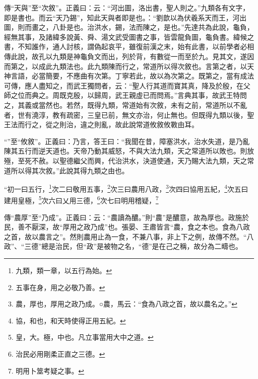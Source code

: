 {\noindent\zhuan{}\fzbyks 傳“天與”至“次敘”。正義曰：云：“河出圖，洛出書，聖人則之。”九類各有文字，即是書也。而云“天乃錫”，知此天與者即是也。：“劉歆以為伏羲系天而王，河出圖，則而畫之，八卦是也。治洪水，錫，法而陳之，是也。”先達共為此說，龜負，經無其事，及諸緯多說黃、舜、湯文武受圖書之事，皆雲龍負圖，龜負書。緯候之書，不知誰作，通人討核，謂偽起哀平，雖復前漢之末，始有此書，以前學者必相傳此說，故孔以九類是神龜負文而出，列於背，有數從一而至於九。見其文，遂因而第之，以成此九類法也。此九類陳而行之，常道所以得次敘也。言第之者，以天神言語，必當簡要，不應曲有次第。丁寧若此，故以為次第之。既第之，當有成法可傳，應人盡知之，而武王獨問者，云：“聖人行其道而寶其真，降及於殷，在父師之位而典之。周既克殷，以歸周，武王親虛已而問焉。”言典其事，故武王特問之，其義或當然也。若然，既得九類，常道始有次敘，未有之前，常道所以不亂者，世有澆淳，教有疏密，三皇已前，無文亦治，何止無也。但既得九類以後，聖王法而行之，從之則治，違之則亂，故此說常道攸敘攸斁由耳。 \par}

{\noindent\shu{}\fzkt “”至“攸敘”。正義曰：乃言，答王曰：“我聞在昔，障塞洪水，治水失道，是乃亂陳其五行而逆天道也。天帝乃動其威怒，不與大法九類，天之常道所以敗也。則放殛，至死不赦。以聖德繼父而興，代治洪水，決道使通，天乃賜大法九類，天之常道所以得其次敘。”此說其得九類之由也。 \par}

“初一曰五行，\footnote{九類，類一章，以五行為始。}次二曰敬用五事，\footnote{五事在身，用之必敬乃善。}次三曰農用八政，\footnote{農，厚也，厚用之政乃成。○農，馬云：“食為八政之首，故以農名之。”}次四曰協用五紀，\footnote{協，和也，和天時使得正用五紀。}次五曰建用皇極，\footnote{皇，大。極，中也。凡立事當用大中之道。}次六曰乂用三德，\footnote{治民必用剛柔正直之三德。}次七曰明用稽疑，\footnote{明用卜筮考疑之事。}


{\noindent\zhuan{}\fzbyks 傳“農厚”至“乃成”。正義曰：云：“農讀為醲。”則“農”是醲意，故為厚也。政施於民，善不厭深，故“厚用之政乃成”也。張晏、王肅皆言“農，食之本也。食為八政之首，故以農言之”。然則農用止為一食，不兼八事，非上下之例，故傳不然。“八政”、“三德”總是治民，但“政”是被物之名，“德”是在己之稱，故分為二疇也。 \par}

